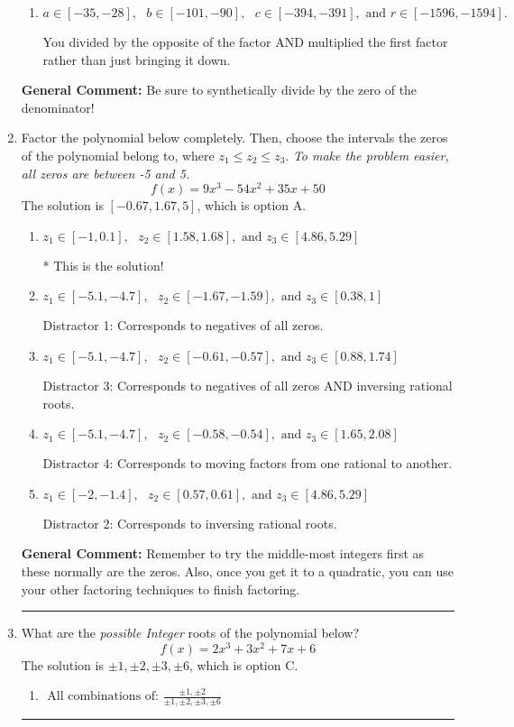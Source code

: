 \documentclass{extbook}[14pt]
\newcommand{\litem}[1]{\item #1

\rule{\textwidth}{0.4pt}}
\begin{document}
\begin{enumerate}
{\begin{enumerate}[label=\Alph*.]
 You multiplied by the synthetic number rather than bringing the first factor down.
\item \( a \in [-35, -28], \text{   } b \in [-101, -90], \text{   } c \in [-394, -391], \text{   and   } r \in [-1596, -1594]. \)

 You divided by the opposite of the factor AND multiplied the first factor rather than just bringing it down.
\end{enumerate}

\textbf{General Comment:} Be sure to synthetically divide by the zero of the denominator!
}
\litem{
Factor the polynomial below completely. Then, choose the intervals the zeros of the polynomial belong to, where $z_1 \leq z_2 \leq z_3$. \textit{To make the problem easier, all zeros are between -5 and 5.}
\[ f(x) = 9x^{3} -54 x^{2} +35 x + 50 \]The solution is \( [-0.67, 1.67, 5] \), which is option A.\begin{enumerate}[label=\Alph*.]
\item \( z_1 \in [-1, 0.1], \text{   }  z_2 \in [1.58, 1.68], \text{   and   } z_3 \in [4.86, 5.29] \)

* This is the solution!
\item \( z_1 \in [-5.1, -4.7], \text{   }  z_2 \in [-1.67, -1.59], \text{   and   } z_3 \in [0.38, 1] \)

 Distractor 1: Corresponds to negatives of all zeros.
\item \( z_1 \in [-5.1, -4.7], \text{   }  z_2 \in [-0.61, -0.57], \text{   and   } z_3 \in [0.88, 1.74] \)

 Distractor 3: Corresponds to negatives of all zeros AND inversing rational roots.
\item \( z_1 \in [-5.1, -4.7], \text{   }  z_2 \in [-0.58, -0.54], \text{   and   } z_3 \in [1.65, 2.08] \)

 Distractor 4: Corresponds to moving factors from one rational to another.
\item \( z_1 \in [-2, -1.4], \text{   }  z_2 \in [0.57, 0.61], \text{   and   } z_3 \in [4.86, 5.29] \)

 Distractor 2: Corresponds to inversing rational roots.
\end{enumerate}

\textbf{General Comment:} Remember to try the middle-most integers first as these normally are the zeros. Also, once you get it to a quadratic, you can use your other factoring techniques to finish factoring.
}
\litem{
What are the \textit{possible Integer} roots of the polynomial below?
\[ f(x) = 2x^{3} +3 x^{2} +7 x + 6 \]The solution is \( \pm 1,\pm 2,\pm 3,\pm 6 \), which is option C.\begin{enumerate}[label=\Alph*.]
\item \( \text{ All combinations of: }\frac{\pm 1,\pm 2}{\pm 1,\pm 2,\pm 3,\pm 6} \)


\end{enumerate}}
\end{enumerate}
\end{document}
